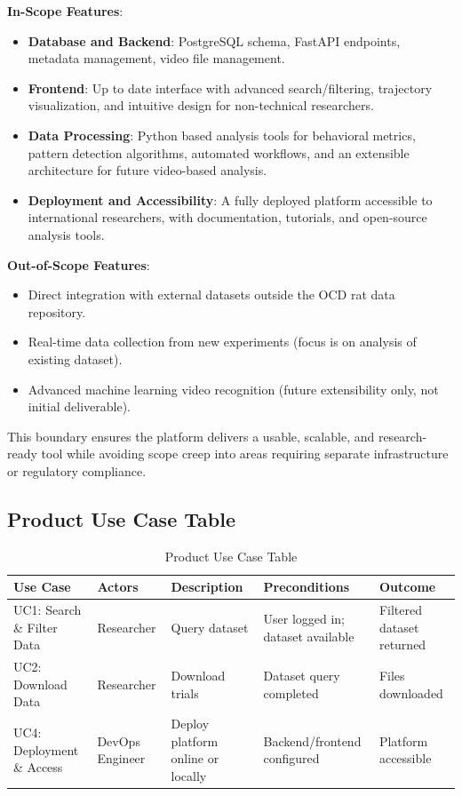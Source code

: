 \documentclass[12pt]{article}
\begin{document}
\textbf{In-Scope Features}:
\begin{itemize}
    \item \textbf{Database and Backend}: PostgreSQL schema, FastAPI endpoints, metadata management, video file management.
    \item \textbf{Frontend}: Up to date interface with advanced search/filtering, trajectory visualization, and intuitive design for non-technical researchers.
    \item \textbf{Data Processing}: Python based analysis tools for behavioral metrics, pattern detection algorithms, automated workflows, and an extensible architecture for future video-based analysis.
    \item \textbf{Deployment and Accessibility}: A fully deployed platform accessible to international researchers, with documentation, tutorials, and open-source analysis tools.
\end{itemize}

\textbf{Out-of-Scope Features}:
\begin{itemize}
    \item Direct integration with external datasets outside the OCD rat data repository.
    \item Real-time data collection from new experiments (focus is on analysis of existing dataset).
    \item Advanced machine learning video recognition (future extensibility only, not initial deliverable).
\end{itemize}

This boundary ensures the platform delivers a usable, scalable, and research-ready tool while avoiding scope creep into areas requiring separate infrastructure or regulatory compliance.

\subsection{Product Use Case Table}

\begin{table}[H]
\centering
\begin{tabular}{|p{2.5cm}|p{2cm}|p{3.0cm}|p{3.0cm}|p{2.5cm}|}
\hline
\textbf{Use Case} & \textbf{Actors} & \textbf{Description} & \textbf{Preconditions} & \textbf{Outcome} \\
\hline
UC1: Search \& Filter Data & Researcher & Query dataset & User logged in; dataset available & Filtered dataset returned \\
\hline
UC2: Download Data & Researcher & Download trials & Dataset query completed & Files downloaded \\
\hline
UC4: Deployment \& Access & DevOps Engineer & Deploy platform online or locally & Backend/frontend configured & Platform accessible \\
\hline
\end{tabular}
\caption{Product Use Case Table}
\end{table}
\end{document}
